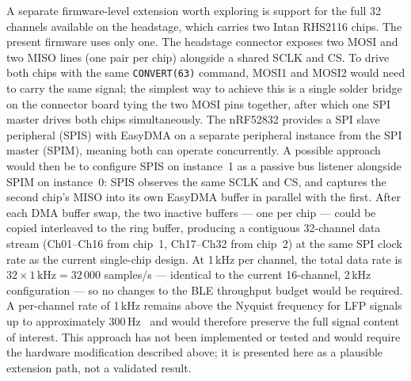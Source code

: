 A separate firmware-level extension worth exploring is support for the full 32 channels
available on the headstage, which carries two Intan RHS2116 chips. The present firmware
uses only one. The headstage connector exposes two MOSI and two MISO lines (one pair
per chip) alongside a shared SCLK and CS. To drive both chips with the same
\texttt{CONVERT(63)} command, MOSI1 and MOSI2 would need to carry the same signal;
the simplest way to achieve this is a single solder bridge on the connector board tying
the two MOSI pins together, after which one SPI master drives both chips simultaneously.
The nRF52832 provides a SPI slave peripheral (SPIS) with EasyDMA on a separate
peripheral instance from the SPI master (SPIM), meaning both can operate concurrently.
A possible approach would then be to configure SPIS on instance~1 as a passive bus
listener alongside SPIM on instance~0: SPIS observes the same SCLK and CS, and
captures the second chip's MISO into its own EasyDMA buffer in parallel with the first.
After each DMA buffer swap, the two inactive buffers --- one per chip --- could be
copied interleaved to the ring buffer, producing a contiguous 32-channel data stream
(Ch01--Ch16 from chip~1, Ch17--Ch32 from chip~2) at the same SPI clock rate as the
current single-chip design. At 1\,kHz per channel, the total data rate is
$32 \times 1\,\text{kHz} = 32\,000$ samples/s --- identical to the current
16-channel, 2\,kHz configuration --- so no changes to the BLE throughput budget
would be required. A per-channel rate of
1\,kHz remains above the Nyquist frequency for LFP signals up to approximately
300\,Hz~\cite{reimann2013biophysically} and would therefore preserve the full signal
content of interest. This approach has not been implemented or tested and would require
the hardware modification described above; it is presented here as a plausible extension
path, not a validated result.
